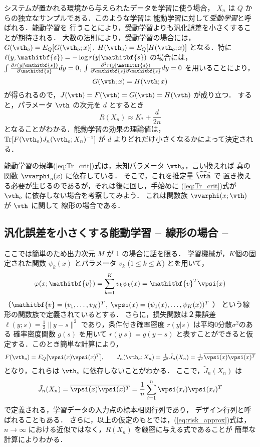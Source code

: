 \documentclass[master]{cimt}
\newcommand{\parder}[2]{\frac{\partial #1}{\partial #2}}
\newcommand{\hvth}{\widehat{{\vth}}}
\newcommand{\vv}{\mathitbf{v}}
\newcommand{\vs}{\mathitbf{s}}
\newcommand{\trace}{\text{Tr}}
\begin{document}
システムが置かれる環境から与えられたデータを学習に使う場合，
$X_n$ は $Q$ からの独立なサンプルである．このような学習は
能動学習に対して{\em 受動学習}と呼ばれる．能動学習を
行うことにより，受動学習よりも汎化誤差を小さくすることが期待される．
大数の法則により，受動学習の場合には，
$G(\vth_o) = E_Q[ G(\vth_o; x) ]$, $H(\vth_o) = E_Q[ H(\vth_o; x)]$ 
となる．特に
$\ell(y, \vs) = - \log r(y | \vs)$ の場合には，
$
	\int \parder{r(y | \vs) }{\vs} dy = 0
$, 	
$\int \frac{\partial^2 r(y | \vs) }{\partial\vs 
	\partial \vs} dy = 0
$
を用いることにより，
\begin{equation*}
	G(\vth;x) = H(\vth;x)
\end{equation*}
が得られるので，$J(\vth) = F(\vth) = G(\vth) = H(\vth)$ が成り立つ．
すると，パラメータ $\vth$ の次元を
$d$ とするとき
\begin{equation*}
	R(X_n) \approx K_* + \frac{d}{2n}
\end{equation*}
となることがわかる．能動学習の効果の理論値は，
$\trace[ F(\vth_o) J_n(\vth_o; X_n)^{-1}]$ 
が $d$ よりどれだけ小さくなるかによって決定される．

能動学習の規準(\ref{eq:Tr_crit})式は，未知パラメータ $\vth_o$，言い換えれば
真の関数 $\vvarphi_o(x)$ に依存している．
そこで，これを推定量 $\hvth$ で
置き換える必要が生じるのであるが，それは後に回し，手始めに
(\ref{eq:Tr_crit})式が $\vth_o$ に依存しない場合を考察してみよう．
これは関数族 $\vvarphi(x; \vth)$ が $\vth$ に関して
線形の場合である．

\subsection{汎化誤差を小さくする能動学習 -- 線形の場合 --}
\label{sec:asymp_al}
ここでは簡単のため出力次元 $M$ が 1 の場合に話を限る．
学習機械が，$K$個の固定された関数 $\psi_k(x)$ とパラメータ 
$v_k$ ($1 \leq k \leq K$) とを用いて，
\begin{equation*}
	\varphi(x; \vv) = \sum_{k=1}^K v_k \psi_k(x) = \vv^T \vpsi(x) 
\end{equation*}
（$\vv = (v_1,\ldots,v_K)^T$, 
$\vpsi(x) = (\psi_1(x), \ldots, \psi_K(x))^T$ ）
という線形の関数族で定義されているとする．
さらに，損失関数は２乗誤差 $\ell(y; s) = \frac{1}{2}\| y - s \|^2$ 
であり，条件付き確率密度 $r(y | s) $ は平均0分散$\sigma^2$のある
確率密度関数 $g(s)$ を用いて
$
	r(y | s ) = g(y - s)
$
と表すことができると仮定する．このとき簡単な計算により，
\begin{equation*}
	F(\vth_o) = E_Q[\vpsi(x)\vpsi(x)^T], \qquad 
	J_n(\vth_o; X_n) = \tfrac{1}{\sigma^2} \tilde{J}_n(X_n) = 
	\tfrac{1}{\sigma^2} \overline{\vpsi(x)\vpsi(x)^T}
\end{equation*}
となり，これらは $\vth_o$ に依存しないことがわかる．
ここで，$\tilde{J}_n(X_n)$ は
\begin{equation*}
	\tilde{J}_n(X_n) = \overline{\vpsi(x)\vpsi(x)^T} = \frac{1}{n} 
	\sum_{i=1}^n \vpsi(x_i)\vpsi(x_i)^T
\end{equation*}
で定義される，学習データの入力点の標本相関行列であり，
デザイン行列と呼ばれることもある．
さらに，以上の仮定のもとでは，(\ref{eq:risk_approx})式は，$n\to\infty$ 
における近似ではなく，$R(X_n)$ を厳密に与える式であることが
簡単な計算によりわかる．
\end{document}
